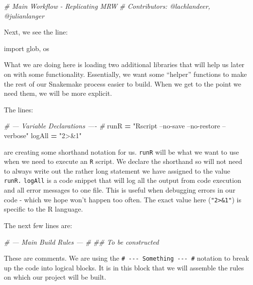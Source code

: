 \documentclass[]{book}
\newenvironment{Shaded}{\begin{snugshade}}{\end{snugshade}}
\newcommand{\StringTok}[1]{\textcolor[rgb]{0.31,0.60,0.02}{{#1}}}
\newcommand{\ImportTok}[1]{{#1}}
\newcommand{\CommentTok}[1]{\textcolor[rgb]{0.56,0.35,0.01}{\textit{{#1}}}}
\newcommand{\OperatorTok}[1]{\textcolor[rgb]{0.81,0.36,0.00}{\textbf{{#1}}}}
\newcommand{\NormalTok}[1]{{#1}}
\theoremstyle{definition}
\theoremstyle{definition}
\theoremstyle{definition}
\theoremstyle{remark}
\begin{document}
\begin{Shaded}
\begin{Highlighting}[]
\CommentTok{# Main Workflow - Replicating MRW}
\CommentTok{# Contributors: @lachlandeer, @julianlanger}
\end{Highlighting}
\end{Shaded}

Next, we see the line:

\begin{Shaded}
\begin{Highlighting}[]
\ImportTok{import} \NormalTok{glob, os}
\end{Highlighting}
\end{Shaded}

What we are doing here is loading two additional libraries that will
help us later on with some functionality. Essentially, we want some
``helper'' functions to make the rest of our Snakemake process easier to
build. When we get to the point we need them, we will be more explicit.

The lines:

\begin{Shaded}
\begin{Highlighting}[]
\CommentTok{# --- Variable Declarations ---- #}
\NormalTok{runR }\OperatorTok{=} \StringTok{"Rscript --no-save --no-restore --verbose"}
\NormalTok{logAll }\OperatorTok{=} \StringTok{"2>&1"}
\end{Highlighting}
\end{Shaded}

are creating some shorthand notation for us. \texttt{runR} will be what
we want to use when we need to execute an \texttt{R} script. We declare
the shorthand so will not need to always write out the rather long
statement we have assigned to the value \texttt{runR.} \texttt{logAll}
is a code snippet that will log all the output from code execution and
all error messages to one file. This is useful when debugging errors in
our code - which we hope won't happen too often. The exact value here
(\texttt{"2\textgreater{}\&1"}) is specific to the R language.

The next few lines are:

\begin{Shaded}
\begin{Highlighting}[]
\CommentTok{# --- Main Build Rules --- #}
\CommentTok{## To be constructed}
\end{Highlighting}
\end{Shaded}

These are comments. We are using the
\texttt{\#\ -\/-\/-\ Something\ -\/-\/-\ \#} notation to break up the
code into logical blocks. It is in this block that we will assemble the
rules on which our project will be built.
\end{document}
